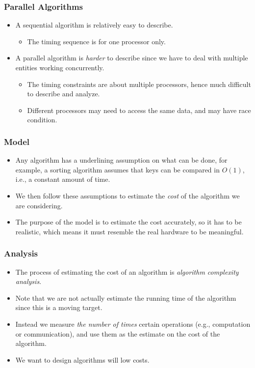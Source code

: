 \documentclass{beamer}
\begin{document}
\begin{CJK}{UTF8}{bsmi}
\begin{frame}
\frametitle{Parallel Algorithms}
\begin{itemize}
\item A sequential algorithm is relatively easy to describe.
\begin{itemize}
\item The timing sequence is for one processor only.
\end{itemize}
\item A parallel algorithm is {\em harder} to describe since we have
  to deal with multiple entities working concurrently.
\begin{itemize}
\item The timing constraints are about multiple processors, hence much
  difficult to describe and analyze.
\item Different processors may need to access the same data, and may
  have race condition.
\end{itemize}
\end{itemize}
\end{frame}

\begin{frame}
\frametitle{Model}
\begin{itemize}
\item Any algorithm has a underlining assumption on what can be done,
  for example, a sorting algorithm assumes that keys can be compared
  in $O(1)$, i.e., a constant amount of time.
\item We then follow these assumptions to estimate the {\em cost} of
  the algorithm we are considering.
\item The purpose of the model is to estimate the cost accurately, so
  it has to be realistic, which means it must resemble the real
  hardware to be meaningful.
\end{itemize}
\end{frame}

\begin{frame}
\frametitle{Analysis}
\begin{itemize}
\item The process of estimating the cost of an algorithm is {\em
  algorithm complexity analysis}.
\item Note that we are not actually estimate the running time of the
  algorithm since this is a moving target.
\item Instead we measure {\em the number of times} certain operations
  (e.g., computation or communication), and use them as the estimate
  on the cost of the algorithm.
\item We want to design algorithms will low costs.
\end{itemize}
\end{frame}



\end{CJK}
\end{document}
